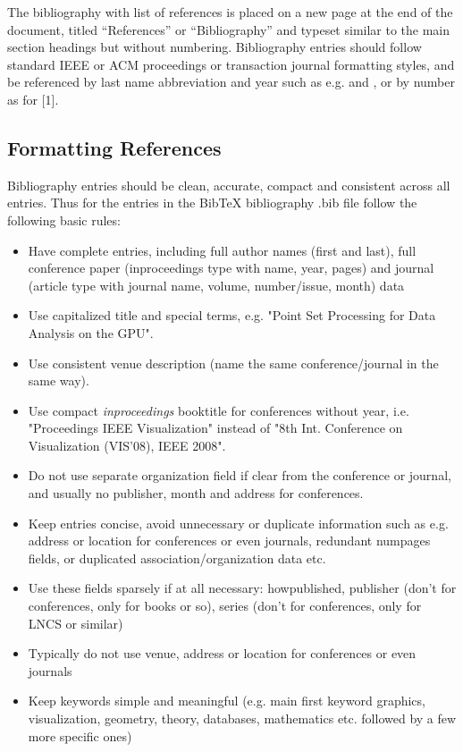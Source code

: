 \documentclass[11pt, a4paper,oneside,chapterprefix=false]{scrbook}
\begin{document}
The bibliography with list of references is placed on a new page at the end of the document, titled ``References'' or ``Bibliography'' and typeset similar to the main section headings but without numbering. Bibliography entries should follow standard IEEE or ACM proceedings or transaction journal formatting styles, and be referenced by last name abbreviation and year such as e.g. \cite{Pajarola:07} and \cite{GSSP:10}, or by number as for [1].

\subsection*{Formatting References}


Bibliography entries should be clean, accurate, compact and consistent across all entries. Thus for the entries in the BibTeX bibliography .bib file follow the following basic rules:

\begin{itemize}
\item Have complete entries, including full author names (first and last), full conference paper (inproceedings type with name, year, pages) and journal (article type with journal name, volume, number/issue, month) data
\item Use capitalized title and special terms, e.g. "Point Set Processing for Data Analysis on the {GPU}".
\item Use consistent venue description (name the same conference/journal in the same way).
\item Use compact \emph{inproceedings} booktitle for conferences without year, i.e. "Proceedings IEEE Visualization" instead of "8th Int. Conference on Visualization (VIS'08), IEEE 2008".
\item Do not use separate organization field if clear from the conference or journal, and usually no publisher, month and address for conferences.
\item Keep entries concise, avoid unnecessary or duplicate information such as e.g. address or location for conferences or even journals, redundant numpages fields, or duplicated association/organization data etc.
\item Use these fields sparsely if at all necessary: howpublished, publisher (don't for conferences, only for books or so), series (don't for conferences, only for LNCS or similar)
\item Typically do not use venue, address or location for conferences or even journals
\item Keep keywords simple and meaningful (e.g. main first keyword graphics, visualization, geometry, theory, databases, mathematics etc. followed by a few more specific ones)
\end{itemize}
\end{document}
